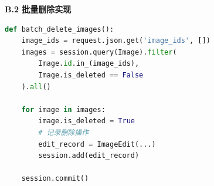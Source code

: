 \documentclass[12pt,a4paper]{article}
\begin{document}
\textbf{B.2 批量删除实现}

\begin{lstlisting}[language=Python]
def batch_delete_images():
    image_ids = request.json.get('image_ids', [])
    images = session.query(Image).filter(
        Image.id.in_(image_ids),
        Image.is_deleted == False
    ).all()
    
    for image in images:
        image.is_deleted = True
        # 记录删除操作
        edit_record = ImageEdit(...)
        session.add(edit_record)
    
    session.commit()
\end{lstlisting}
\end{document}
